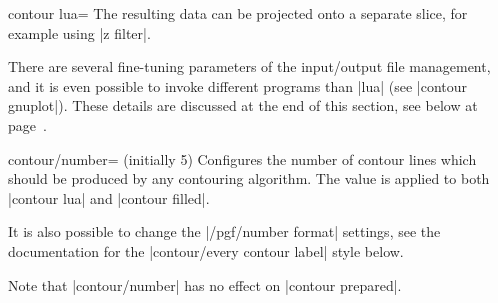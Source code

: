 {{\begin{plottype}[/pgfplots]{
    contour lua=\textcolor{black}{}%
}
    The resulting data can be projected onto a separate slice, for example
    using |z filter|.
\pgfplotsexpensiveexample
\begin{codeexample}[]
\end{codeexample}

    There are several fine-tuning parameters of the input/output file
    management, and it is even possible to invoke different programs than
    |lua| (see |contour gnuplot|). These details are discussed at the end of this
    section, see below at page~\pageref{key:pgfplots:contour:gnuplot}.
\end{plottype}

\begin{pgfplotskey}{contour/number= (initially 5)}
    Configures the number of contour lines which should be produced by any
    contouring algorithm. The value is applied to both |contour lua| and
    |contour filled|.
\pgfplotsexpensiveexample
\begin{codeexample}[]
\end{codeexample}
    It is also possible to change the |/pgf/number format| settings, see the
    documentation for the |contour/every contour label| style below.

    Note that |contour/number| has no effect on |contour prepared|.
\end{pgfplotskey}

}}
